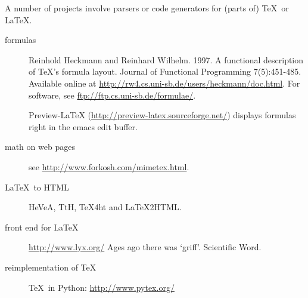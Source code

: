 A number of projects involve parsers or code generators for (parts of)
\TeX\ or \LaTeX.

\begin{description}
\item[formulas]
Reinhold Heckmann and Reinhard Wilhelm. 1997.  A functional
description of TeX's formula layout.  Journal of Functional
Programming 7(5):451-485. Available online at
\url{http://rw4.cs.uni-sb.de/users/heckmann/doc.html}.
For software, see \url{ftp://ftp.cs.uni-sb.de/formulae/}.

Preview-LaTeX (\url{http://preview-latex.sourceforge.net/}) displays
formulas right in the emacs edit buffer.
\item[math on web pages]see \url{http://www.forkosh.com/mimetex.html}.
\item[\LaTeX\ to HTML] HeVeA, TtH, TeX4ht and LaTeX2HTML.
\item[front end for \LaTeX] \url{http://www.lyx.org/}
Ages ago there was `griff'. Scientific Word.
\item[reimplementation of \TeX] \TeX\ in Python: \url{http://www.pytex.org/}
\end{description}

